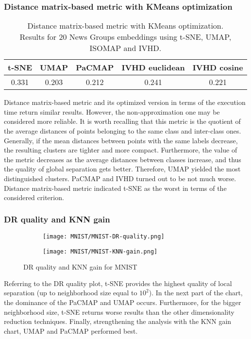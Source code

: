 \documentclass[12pt]{article}
\begin{document}
\subsubsection{Distance matrix-based metric with KMeans optimization}
\begin{table}[h]
\centering
\caption{Distance matrix-based metric with KMeans optimization. \\ Results for 20 News Groups embeddings using t-SNE, UMAP, ISOMAP and IVHD.}
\begin{tabular}{|c|c|l|l|l|}
\hline
\textbf{t-SNE} & \textbf{UMAP} & \textbf{PaCMAP}            & \textbf{IVHD euclidean}    & \textbf{IVHD cosine}       \\ \hline
0.331          & 0.203         & \multicolumn{1}{c|}{0.212} & \multicolumn{1}{c|}{0.241} & \multicolumn{1}{c|}{0.221} \\ \hline
\end{tabular}
\end{table}
Distance matrix-based metric and its optimized version in terms of the execution time return similar results. However, the non-approximation one may be considered more reliable. It is worth recalling that this metric is the quotient of the average distances of points belonging to the same class and inter-class ones. Generally, if the mean distances between points with the same labels decrease, the resulting clusters are tighter and more compact. Furthermore, the value of the metric decreases as the average distances between classes increase, and thus the quality of global separation gets better. Therefore, UMAP yielded the most distinguished clusters. PaCMAP and IVHD turned out to be not much worse. Distance matrix-based metric indicated t-SNE as the worst in terms of the considered criterion. 

\clearpage
\subsubsection{DR quality and KNN gain}
\begin{figure}[h]
\centering
\begin{subfigure}{.5\textwidth}
  \centering
  \texttt{[image: MNIST/MNIST-DR-quality.png]}
  \label{fig:sub1}
\end{subfigure}%
\begin{subfigure}{.5\textwidth}
  \centering
  \texttt{[image: MNIST/MNIST-KNN-gain.png]}
  \label{fig:sub2}
\end{subfigure}
\caption{DR quality and KNN gain for MNIST}
\label{fig:test}
\end{figure}
Referring to the DR quality plot, t-SNE provides the highest quality of local separation (up to neighborhood size equal to $10^2$). In the next part of the chart, the dominance of the PaCMAP and UMAP occurs. Furthermore, for the bigger neighborhood size, t-SNE returns worse results than the other dimensionality reduction techniques. Finally, strengthening the analysis with the KNN gain chart, UMAP and PaCMAP performed best.
\end{document}
